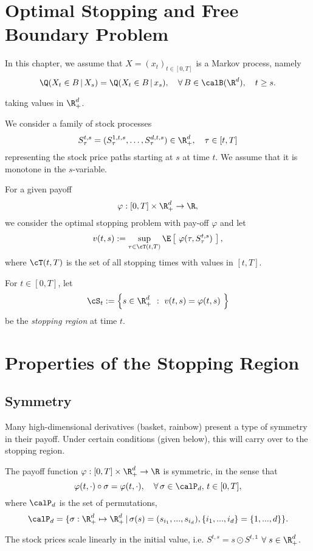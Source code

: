 \section{Optimal Stopping and Free Boundary Problem}

In this chapter, we assume that $X = (x_t)_{t\in [0,T]}$ is a Markov process, namely
$$\Q (X_{t} \in B \,|\, X_s) = \Q (X_{t} \in B \,|\, x_s), \quad \forall \, B \in \calB(\R^d), \quad t \ge s. $$

taking values in $\R_{+}^d$. 

We consider a family of
stock processes 
$$
S^{t,s}_\tau = (S^{1,t,s}_\tau,\ldots,S^{d,t,s}_\tau) \in \R_+^d, \quad \tau \in [t,T]
$$
representing the stock price paths starting at $s$ at time $t$.
We assume that it is monotone in the $s$-variable.

For a given payoff
$$
\varphi: [0,T]\times \R_+^d \to \R,
$$
we consider the optimal stopping problem with pay-off $\varphi$
and let
$$
v(t,s):= \sup_{\tau \in \cT(t,T) } 
\E\left[ \ \varphi(\tau,S^{t,s}_\tau)\ \right],
$$
where $\cT(t,T)$ is the set of all
stopping times with values in $[t,T]$.

For $t \in [0,T]$, let
$$
\cS_t:= \left\{ s \in \R_+^d\ :\
v(t,s)=\varphi(t,s)\ \right\}
$$
be the \emph{stopping region} at time $t$.

\section{Properties of the Stopping Region}
\subsection{Symmetry}
Many high-dimensional derivatives (basket, rainbow) present a type of symmetry in their payoff.  Under certain conditions (given below), this will carry over to the  stopping region.

\begin{asm} \label{asm: sym}
    The payoff function $\varphi:[0,T]\times \R_+^d \to \R$ is symmetric, in the sense that 
    $$\varphi(t,\cdot) \circ \sigma = \varphi(t,\cdot), \quad \forall \, \sigma \in \calP_d,\, t \in [0,T], $$
    where $\calP_d$ is the set of permutations,
    $$\calP_d = \{\sigma: \R^d_+ \mapsto \R^d_+ \, |\, \sigma(s)=(s_{i_1},...,s_{i_d}), \{i_1,...,i_d\} = \{1,...,d\} \}.$$
\end{asm}

\begin{asm} \label{asm: scale}
    The stock prices scale linearly in the initial value, i.e. $S^{t,s}= s \odot S^{t,\mathds{1}}$ $ \forall \; s \in  \R_+^d$.
\end{asm}

